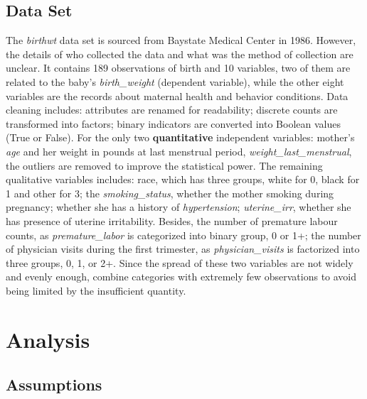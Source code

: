 \documentclass[9pt,twocolumn,twoside,]{pnas-new}
\begin{document}
\hypertarget{data-set}{%
\subsection*{Data Set}\label{data-set}}

The \emph{birthwt} data set is sourced from Baystate Medical Center in
1986. However, the details of who collected the data and what was the
method of collection are unclear. It contains 189 observations of birth
and 10 variables, two of them are related to the baby's
\emph{birth\_weight} (dependent variable), while the other eight
variables are the records about maternal health and behavior conditions.
Data cleaning includes: attributes are renamed for readability; discrete
counts are transformed into factors; binary indicators are converted
into Boolean values (True or False). For the only two
\textbf{quantitative} independent variables: mother's \emph{age} and her
weight in pounds at last menstrual period,
\emph{weight\_last\_menstrual}, the outliers are removed to improve the
statistical power. The remaining qualitative variables includes: race,
which has three groups, white for 0, black for 1 and other for 3; the
\emph{smoking\_status}, whether the mother smoking during pregnancy;
whether she has a history of \emph{hypertension}; \emph{uterine\_irr},
whether she has presence of uterine irritability. Besides, the number of
premature labour counts, as \emph{premature\_labor} is categorized into
binary group, 0 or 1+; the number of physician visits during the first
trimester, as \emph{physician\_visits} is factorized into three groups,
0, 1, or 2+. Since the spread of these two variables are not widely and
evenly enough, combine categories with extremely few observations to
avoid being limited by the insufficient quantity.

\hypertarget{analysis}{%
\section*{Analysis}\label{analysis}}

\hypertarget{assumptions}{%
\subsection*{Assumptions}\label{assumptions}}
\end{document}
